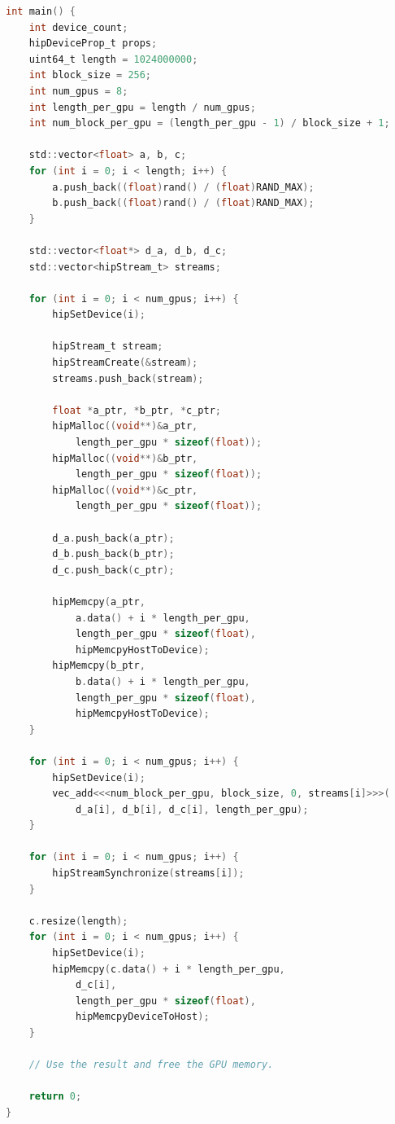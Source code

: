 \begin{lstlisting}[language=C, caption={用stream設計多GPU程式}, captionpos=t, label={lst:multiGPUs_streams}]
int main() {
    int device_count;
    hipDeviceProp_t props;
    uint64_t length = 1024000000;
    int block_size = 256;
    int num_gpus = 8;
    int length_per_gpu = length / num_gpus;
    int num_block_per_gpu = (length_per_gpu - 1) / block_size + 1;

    std::vector<float> a, b, c;
    for (int i = 0; i < length; i++) {
        a.push_back((float)rand() / (float)RAND_MAX);
        b.push_back((float)rand() / (float)RAND_MAX);
    }

    std::vector<float*> d_a, d_b, d_c;
    std::vector<hipStream_t> streams;

    for (int i = 0; i < num_gpus; i++) {
        hipSetDevice(i);

        hipStream_t stream;
        hipStreamCreate(&stream);
        streams.push_back(stream);

        float *a_ptr, *b_ptr, *c_ptr;
        hipMalloc((void**)&a_ptr,
            length_per_gpu * sizeof(float));
        hipMalloc((void**)&b_ptr,
            length_per_gpu * sizeof(float));
        hipMalloc((void**)&c_ptr,
            length_per_gpu * sizeof(float));

        d_a.push_back(a_ptr);
        d_b.push_back(b_ptr);
        d_c.push_back(c_ptr);

        hipMemcpy(a_ptr,
            a.data() + i * length_per_gpu,
            length_per_gpu * sizeof(float),
            hipMemcpyHostToDevice);
        hipMemcpy(b_ptr,
            b.data() + i * length_per_gpu,
            length_per_gpu * sizeof(float),
            hipMemcpyHostToDevice);
    }

    for (int i = 0; i < num_gpus; i++) {
        hipSetDevice(i);
        vec_add<<<num_block_per_gpu, block_size, 0, streams[i]>>>(
            d_a[i], d_b[i], d_c[i], length_per_gpu);
    }

    for (int i = 0; i < num_gpus; i++) {
        hipStreamSynchronize(streams[i]);
    }

    c.resize(length);
    for (int i = 0; i < num_gpus; i++) {
        hipSetDevice(i);
        hipMemcpy(c.data() + i * length_per_gpu,
            d_c[i],
            length_per_gpu * sizeof(float),
            hipMemcpyDeviceToHost);
    }

    // Use the result and free the GPU memory.

    return 0;
}
\end{lstlisting}

